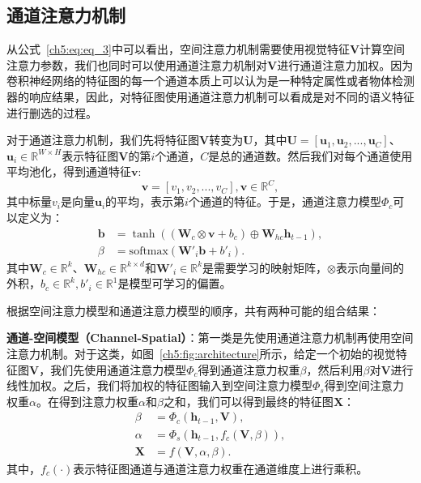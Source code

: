 \subsection{通道注意力机制}
从公式~\ref{ch5:eq:eq_3}中可以看出，空间注意力机制需要使用视觉特征$\mathbf{V}$计算空间注意力参数，我们也同时可以使用通道注意力机制对$\mathbf{V}$进行通道注意力加权。因为卷积神经网络的特征图的每一个通道本质上可以认为是一种特定属性或者物体检测器的响应结果，因此，对特征图使用通道注意力机制可以看成是对不同的语义特征进行删选的过程。

对于通道注意力机制，我们先将特征图$\mathbf{V}$转变为$\mathbf{U}$，其中$\mathbf{U} = [\mathbf{u}_1, \mathbf{u}_2, ..., \mathbf{u}_C]$、$\mathbf{u}_i \in \mathbb{R}^{W \times H}$表示特征图$\mathbf{V}$的第$i$个通道，$C$是总的通道数。然后我们对每个通道使用平均池化，得到通道特征$\mathbf{v}$:
\begin{equation}
\mathbf{v} = \left[v_1, v_2, ..., v_C \right], \mathbf{v} \in \mathbb{R}^{C},
\end{equation}
其中标量$v_i$是向量$\mathbf{u}_i$的平均，表示第$i$个通道的特征。于是，通道注意力模型$\Phi_c$可以定义为：
\begin{equation} \label{ch5:eq:eq_7}
\begin{split}
\mathbf{b} & = \tanh \left(\left(\mathbf{W}_c \otimes \mathbf{v} + b_c \right) \oplus \mathbf{W}_{hc}\mathbf{h}_{t-1} \right), \\
\beta & = \textrm{softmax} \left(\mathbf{W'}_i \mathbf{b} + {b'}_i \right).
\end{split}
\end{equation}
其中$\mathbf{W}_c \in \mathbb{R}^k$、$\mathbf{W}_{hc} \in \mathbb{R}^{k \times d}$和$\mathbf{W'}_i \in \mathbb{R}^k$是需要学习的映射矩阵，$\otimes$表示向量间的外积，$b_c \in \mathbb{R}^k, {b'}_i \in \mathbb{R}^1$是模型可学习的偏置。

根据空间注意力模型和通道注意力模型的顺序，共有两种可能的组合结果：

\textbf{通道-空间模型（Channel-Spatial）}：第一类是先使用通道注意力机制再使用空间注意力机制。对于这类，如图~\ref{ch5:fig:architecture}所示，给定一个初始的视觉特征图$\mathbf{V}$，我们先使用通道注意力模型$\Phi_c$得到通道注意力权重$\beta$，然后利用$\beta$对$\mathbf{V}$进行线性加权。之后，我们将加权的特征图输入到空间注意力模型$\Phi_s$得到空间注意力权重$\alpha$。在得到注意力权重$\alpha$和$\beta$之和，我们可以得到最终的特征图$\mathbf{X}$：
\begin{equation} \label{ch5:eq:eq_8}
\begin{split}
\beta &= \Phi_c \left(\mathbf{h}_{t-1},\mathbf{V} \right), \\
\alpha &= \Phi_s \left(\mathbf{h}_{t-1}, f_c \left(\mathbf{V}, \beta \right) \right), \\
\mathbf{X} &= f \left(\mathbf{V}, \alpha, \beta \right).
\end{split}
\end{equation}
其中，$f_c(\cdot)$表示特征图通道与通道注意力权重在通道维度上进行乘积。


